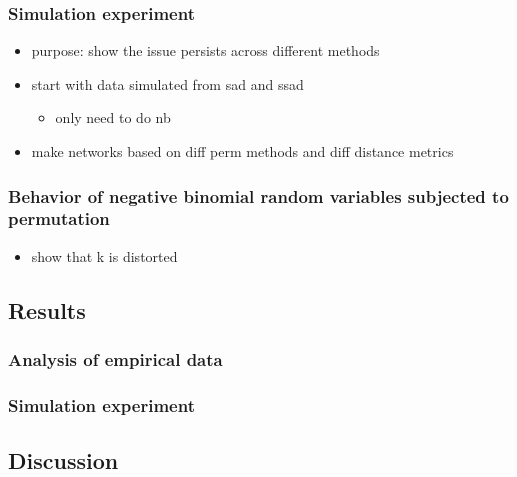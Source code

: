 \documentclass[
  letterpaper,
  DIV=11,
  numbers=noendperiod]{scrartcl}
\providecommand{\tightlist}{%
  \setlength{\itemsep}{0pt}\setlength{\parskip}{0pt}}
\begin{document}
\subsubsection{Simulation experiment}\label{simulation-experiment}

\begin{itemize}
\tightlist
\item
  purpose: show the issue persists across different methods
\item
  start with data simulated from sad and ssad

  \begin{itemize}
  \tightlist
  \item
    only need to do nb
  \end{itemize}
\item
  make networks based on diff perm methods and diff distance metrics
\end{itemize}

\subsubsection{Behavior of negative binomial random variables subjected
to
permutation}\label{behavior-of-negative-binomial-random-variables-subjected-to-permutation}

\begin{itemize}
\tightlist
\item
  show that k is distorted
\end{itemize}

\subsection{Results}\label{results}

\subsubsection{Analysis of empirical
data}\label{analysis-of-empirical-data-1}

\subsubsection{Simulation experiment}\label{simulation-experiment-1}

\subsection{Discussion}\label{discussion}
\end{document}
